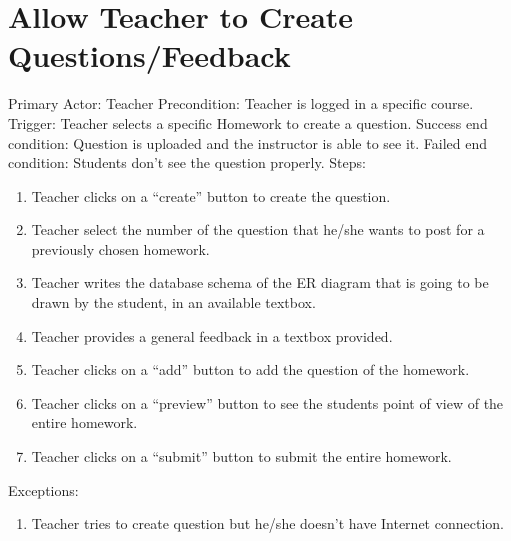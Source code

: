     \section{Allow Teacher to Create    Questions/Feedback}
         Primary Actor: Teacher \newline
        Precondition: Teacher is logged in a specific course. \newline
        Trigger: Teacher selects a specific Homework to create a     question. \newline
        Success end condition: Question is uploaded and the instructor is able to see it. \newline
        Failed end condition: Students don’t see the question       properly. \newline
        \newline
        Steps:
        \begin{enumerate}
            \item{Teacher clicks on a “create” button to create the           question.}
            \item{Teacher select the number of the question that             he/she wants to post for a previously chosen               homework.}
            \item{Teacher writes the database schema of the ER              diagram that is going to be drawn by the student, in         an available textbox.}
            \item{Teacher provides a general feedback in a textbox            provided.}
            \item{Teacher clicks on a “add” button to add the                 question of the homework.}
            \item{Teacher clicks on a “preview” button to see the           students point of view of the entire homework.}
            \item{Teacher clicks on a “submit” button to submit the           entire homework.}
        \end{enumerate}
        Exceptions:
        \begin{enumerate}
            \item{Teacher tries to create question but he/she doesn't have Internet connection.}
        \end{enumerate}

    
